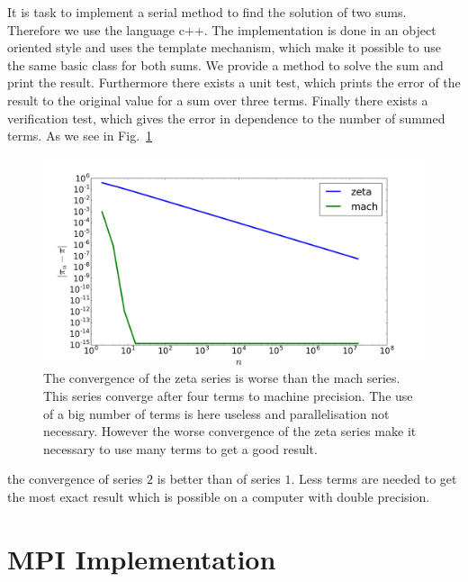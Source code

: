 It is task to implement a serial method to find the solution of two sums. Therefore we use the language c++. The implementation is done in an object oriented style and uses the template mechanism, which make it possible to use the same basic class for both sums. We provide a method to solve the sum and print the result. Furthermore there exists a unit test, which prints the error of the result to the original value for a sum over three terms. Finally there exists a verification test, which gives the error in dependence to the number of summed terms. As we see in Fig.~\ref{fig:convergence_series}\begin{figure}[h] 
  \centering
     \includegraphics[width=\textwidth]{pic/convergence_series.png}
  \caption{The convergence of the zeta series is worse than the mach series. This series converge after four terms to machine precision. The use of a big number of terms is here useless and parallelisation not necessary. However the worse convergence of the zeta series make it necessary to use many terms to get a good result.}
  \label{fig:convergence_series}
\end{figure} the convergence of series $2$ is better than of series $1$. Less terms are needed to get the most exact result which is possible on a computer with double precision. 






\section{MPI Implementation}

